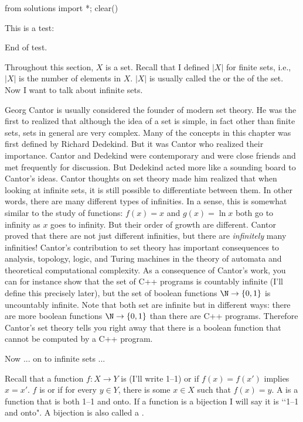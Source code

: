  \label{S:countability}
\begin{python0}
from solutions import *; clear()
\end{python0}

This is a test:

End of test.

Throughout this section, $X$ is a set. Recall that I defined
$|X|$ for finite sets, i.e., $|X|$ is the number of elements in $X$.
$|X|$ is usually called the
or the
\sidebarskip{12pt}\sidebarskip{0pt}
of the set.
Now I want to talk about infinite sets.

Georg Cantor is usually considered the founder of modern
set theory.
He was the first to realized that although
the idea of a set is simple, in fact other than finite sets,
sets in general are very complex.
Many of the concepts in this chapter was first defined
by
Richard Dedekind.
But it was Cantor who realized their importance.
Cantor and Dedekind were contemporary and were close friends
and met frequently for discussion.
But Dedekind acted more like a sounding board to Cantor's ideas.
Cantor thoughts on set theory made him realized that
when looking at infinite sets, it is
still possible to differentiate between them.
In other words, there are many different types of infinities.
In a sense, this is somewhat similar to the study of functions:
$f(x) = x$ and $g(x) = \ln x$ both go to infinity as $x$ goes to
infinity. But their order of growth are different.
Cantor proved that there are not just different infinities,
but there are \textit{infinitely} many infinities!
Cantor's contribution to set theory has important
consequences to analysis, topology, logic, and
Turing machines in the theory of automata and
theoretical computational complexity.
As a consequence of Cantor's work, you can for instance show that
the set of C++ programs is countably infinite (I'll
define this precisely later), but the set of
boolean functions $\N \rightarrow \{0, 1\}$ is uncountably
infinite. Note that both set are infinite but in different ways:
there are more boolean functions $\N \rightarrow \{0, 1\}$
than there are C++ programs.
Therefore Cantor's set theory tells you right away that
there is a boolean function that cannot be computed by a C++
program.

Now ... on to infinite sets ...

Recall that a function $f: X \rightarrow Y$
is
(I'll write 1--1) or
\sidebarskip{0pt}\sidebarskip{0pt}
if
$f(x) = f(x')$ implies $x = x'$.
$f$ is
\sidebarskip{12pt}\sidebarskip{0pt} or
\sidebarskip{24pt}\sidebarskip{0pt}
if for every $y \in Y$, there is some $x \in X$ such that
$f(x) = y$.
A
\sidebarskip{12pt} %
is a function that is both 1--1 and onto.
If a function is a bijection I will say it is \lq\lq 1--1 and onto".
A bijection is also called a
\sidebarskip{1pt}.

